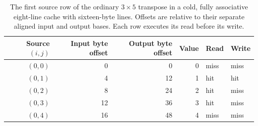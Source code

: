 \begin{table}[htbp]
  \centering
  \small
  \begin{tabular}{rrrrll}
    \toprule
    Source $(i,j)$ & Input byte offset & Output byte offset & Value & Read & Write \\
    \midrule
    $(0,0)$        & 0                 & 0                  & 0     & miss & miss  \\
    $(0,1)$        & 4                 & 12                 & 1     & hit  & hit   \\
    $(0,2)$        & 8                 & 24                 & 2     & hit  & miss  \\
    $(0,3)$        & 12                & 36                 & 3     & hit  & miss  \\
    $(0,4)$        & 16                & 48                 & 4     & miss & miss  \\
    \bottomrule
  \end{tabular}
  \caption{The first source row of the ordinary $3\times5$ transpose in a cold, fully associative eight-line cache with sixteen-byte lines. Offsets are relative to their separate aligned input and output bases. Each row executes its read before its write.}
  \label{tab:revision-locality-first-row}
\end{table}
